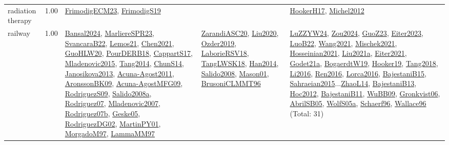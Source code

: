 {\begin{longtable}{p{3cm}r>{\raggedright\arraybackslash}p{6cm}>{\raggedright\arraybackslash}p{6cm}>{\raggedright\arraybackslash}p{8cm}}
\index{radiation therapy}\index{ApplicationAreas!radiation therapy}radiation therapy &  1.00 & \hyperref[detail:FrimodigECM23]{FrimodigECM23}, \hyperref[detail:FrimodigS19]{FrimodigS19} &  & \hyperref[detail:HookerH17]{HookerH17}, \hyperref[detail:Michel2012]{Michel2012}\\
\index{railway}\index{ApplicationAreas!railway}railway &  1.00 & \hyperref[detail:Bansal2024]{Bansal2024}, \hyperref[detail:MarliereSPR23]{MarliereSPR23}, \hyperref[detail:SvancaraB22]{SvancaraB22}, \hyperref[detail:Lemos21]{Lemos21}, \hyperref[detail:Chen2021]{Chen2021}, \hyperref[detail:GuoHLW20]{GuoHLW20}, \hyperref[detail:PourDERB18]{PourDERB18}, \hyperref[detail:CappartS17]{CappartS17}, \hyperref[detail:Mladenovic2015]{Mladenovic2015}, \hyperref[detail:Tang2014]{Tang2014}, \hyperref[detail:ChunS14]{ChunS14}, \hyperref[detail:Janosikova2013]{Janosikova2013}, \hyperref[detail:Acuna-Agost2011]{Acuna-Agost2011}, \hyperref[detail:AronssonBK09]{AronssonBK09}, \hyperref[detail:Acuna-AgostMFG09]{Acuna-AgostMFG09}, \hyperref[detail:RodriguezS09]{RodriguezS09}, \hyperref[detail:Salido2008a]{Salido2008a}, \hyperref[detail:Rodriguez07]{Rodriguez07}, \hyperref[detail:Mladenovic2007]{Mladenovic2007}, \hyperref[detail:Rodriguez07b]{Rodriguez07b}, \hyperref[detail:Geske05]{Geske05}, \hyperref[detail:RodriguezDG02]{RodriguezDG02}, \hyperref[detail:MartinPY01]{MartinPY01}, \hyperref[detail:MorgadoM97]{MorgadoM97}, \hyperref[detail:LammaMM97]{LammaMM97} & \hyperref[detail:ZarandiASC20]{ZarandiASC20}, \hyperref[detail:Liu2020]{Liu2020}, \hyperref[detail:Ozder2019]{Ozder2019}, \hyperref[detail:LaborieRSV18]{LaborieRSV18}, \hyperref[detail:TangLWSK18]{TangLWSK18}, \hyperref[detail:Han2014]{Han2014}, \hyperref[detail:Salido2008]{Salido2008}, \hyperref[detail:Mason01]{Mason01}, \hyperref[detail:BrusoniCLMMT96]{BrusoniCLMMT96} & \hyperref[detail:LuZZYW24]{LuZZYW24}, \hyperref[detail:Zou2024]{Zou2024}, \hyperref[detail:GuoZ23]{GuoZ23}, \hyperref[detail:Eiter2023]{Eiter2023}, \hyperref[detail:LuoB22]{LuoB22}, \hyperref[detail:Wang2021]{Wang2021}, \hyperref[detail:Mischek2021]{Mischek2021}, \hyperref[detail:Hosseinian2021]{Hosseinian2021}, \hyperref[detail:Liu2021a]{Liu2021a}, \hyperref[detail:Eiter2021]{Eiter2021}, \hyperref[detail:Godet21a]{Godet21a}, \hyperref[detail:BogaerdtW19]{BogaerdtW19}, \hyperref[detail:Hooker19]{Hooker19}, \hyperref[detail:Tang2018]{Tang2018}, \hyperref[detail:Li2016]{Li2016}, \hyperref[detail:Ren2016]{Ren2016}, \hyperref[detail:Lorca2016]{Lorca2016}, \hyperref[detail:BajestaniB15]{BajestaniB15}, \hyperref[detail:Sahraeian2015]{Sahraeian2015}...\hyperref[detail:ZhaoL14]{ZhaoL14}, \hyperref[detail:BajestaniB13]{BajestaniB13}, \hyperref[detail:Hoc2012]{Hoc2012}, \hyperref[detail:BajestaniB11]{BajestaniB11}, \hyperref[detail:WuBB09]{WuBB09}, \hyperref[detail:Gronkvist06]{Gronkvist06}, \hyperref[detail:AbrilSB05]{AbrilSB05}, \hyperref[detail:WolfS05a]{WolfS05a}, \hyperref[detail:Schaerf96]{Schaerf96}, \hyperref[detail:Wallace96]{Wallace96} (Total: 31)\\

\end{longtable}}
